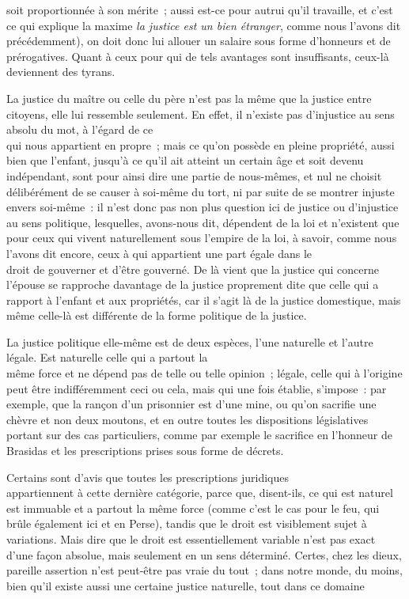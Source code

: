 \documentclass[french,twoside]{book} %
\begin{document}
soit proportionnée à son mérite ; aussi est-ce pour autrui qu’il travaille, et c’est ce qui explique la maxime {\itshape la justice est un bien étranger}, comme nous l’avons dit précédemment), on doit donc lui allouer un salaire sous forme d’honneurs et de prérogatives. Quant à ceux pour qui de tels avantages sont insuffisants, ceux-là deviennent des tyrans.\par
La justice du maître ou celle du père n’est pas la même que la justice entre citoyens, elle lui ressemble seulement. En effet, il n’existe pas d’injustice au sens absolu du mot, à l’égard de ce \\
qui nous appartient en propre ; mais ce qu’on possède en pleine propriété, aussi bien que l’enfant, jusqu’à ce qu’il ait atteint un certain âge et soit devenu indépendant, sont pour ainsi dire une partie de nous-mêmes, et nul ne choisit délibérément de se causer à soi-même du tort, ni par suite de se montrer injuste envers soi-même : il n’est donc pas non plus question ici de justice ou d’injustice au sens politique, lesquelles, avons-nous dit, dépendent de la loi et n’existent que pour ceux qui vivent naturellement sous l’empire de la loi, à savoir, comme nous l’avons dit encore, ceux à qui appartient une part égale dans le \\
droit de gouverner et d’être gouverné. De là vient que la justice qui concerne l’épouse se rapproche davantage de la justice proprement dite que celle qui a rapport à l’enfant et aux propriétés, car il s’agit là de la justice domestique, mais même celle-là est différente de la forme politique de la justice.\par
La justice politique elle-même est de deux espèces, l’une naturelle et l’autre légale. Est naturelle celle qui a partout la \\
même force et ne dépend pas de telle ou telle opinion ; légale, celle qui à l’origine peut être indifféremment ceci ou cela, mais qui une fois établie, s’impose : par exemple, que la rançon d’un prisonnier est d’une mine, ou qu’on sacrifie une chèvre et non deux moutons, et en outre toutes les dispositions législatives portant sur des cas particuliers, comme par exemple le sacrifice en l’honneur de Brasidas et les prescriptions prises sous forme de décrets.\par
Certains sont d’avis que toutes les prescriptions juridiques \\
appartiennent à cette dernière catégorie, parce que, disent-ils, ce qui est naturel est immuable et a partout la même force (comme c’est le cas pour le feu, qui brûle également ici et en Perse), tandis que le droit est visiblement sujet à variations. Mais dire que le droit est essentiellement variable n’est pas exact d’une façon absolue, mais seulement en un sens déterminé. Certes, chez les dieux, pareille assertion n’est peut-être pas vraie du tout ; dans notre monde, du moins, bien qu’il existe aussi une certaine justice naturelle, tout dans ce domaine \\
\end{document}

